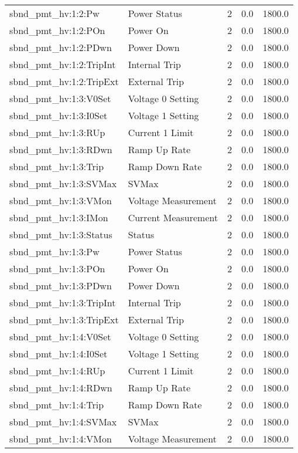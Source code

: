 \begin{center}
\begin{longtable}{l | l l l l }
sbnd\_pmt\_hv:1:2:Pw & Power Status & 2 & 0.0 & 1800.0\\ 
sbnd\_pmt\_hv:1:2:POn & Power On & 2 & 0.0 & 1800.0\\ 
sbnd\_pmt\_hv:1:2:PDwn & Power Down & 2 & 0.0 & 1800.0\\ 
sbnd\_pmt\_hv:1:2:TripInt & Internal Trip & 2 & 0.0 & 1800.0\\ 
sbnd\_pmt\_hv:1:2:TripExt & External Trip & 2 & 0.0 & 1800.0\\ 
sbnd\_pmt\_hv:1:3:V0Set & Voltage 0 Setting & 2 & 0.0 & 1800.0\\ 
sbnd\_pmt\_hv:1:3:I0Set & Voltage 1 Setting & 2 & 0.0 & 1800.0\\ 
sbnd\_pmt\_hv:1:3:RUp & Current 1 Limit & 2 & 0.0 & 1800.0\\ 
sbnd\_pmt\_hv:1:3:RDwn & Ramp Up Rate & 2 & 0.0 & 1800.0\\ 
sbnd\_pmt\_hv:1:3:Trip & Ramp Down Rate & 2 & 0.0 & 1800.0\\ 
sbnd\_pmt\_hv:1:3:SVMax & SVMax & 2 & 0.0 & 1800.0\\ 
sbnd\_pmt\_hv:1:3:VMon & Voltage Measurement & 2 & 0.0 & 1800.0\\ 
sbnd\_pmt\_hv:1:3:IMon & Current Measurement & 2 & 0.0 & 1800.0\\ 
sbnd\_pmt\_hv:1:3:Status & Status & 2 & 0.0 & 1800.0\\ 
sbnd\_pmt\_hv:1:3:Pw & Power Status & 2 & 0.0 & 1800.0\\ 
sbnd\_pmt\_hv:1:3:POn & Power On & 2 & 0.0 & 1800.0\\ 
sbnd\_pmt\_hv:1:3:PDwn & Power Down & 2 & 0.0 & 1800.0\\ 
sbnd\_pmt\_hv:1:3:TripInt & Internal Trip & 2 & 0.0 & 1800.0\\ 
sbnd\_pmt\_hv:1:3:TripExt & External Trip & 2 & 0.0 & 1800.0\\ 
sbnd\_pmt\_hv:1:4:V0Set & Voltage 0 Setting & 2 & 0.0 & 1800.0\\ 
sbnd\_pmt\_hv:1:4:I0Set & Voltage 1 Setting & 2 & 0.0 & 1800.0\\ 
sbnd\_pmt\_hv:1:4:RUp & Current 1 Limit & 2 & 0.0 & 1800.0\\ 
sbnd\_pmt\_hv:1:4:RDwn & Ramp Up Rate & 2 & 0.0 & 1800.0\\ 
sbnd\_pmt\_hv:1:4:Trip & Ramp Down Rate & 2 & 0.0 & 1800.0\\ 
sbnd\_pmt\_hv:1:4:SVMax & SVMax & 2 & 0.0 & 1800.0\\ 
sbnd\_pmt\_hv:1:4:VMon & Voltage Measurement & 2 & 0.0 & 1800.0\\ 

\end{longtable}
\end{center}
